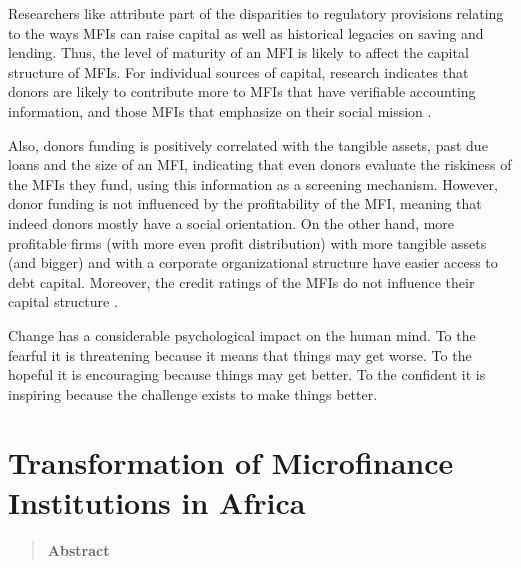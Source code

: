 \documentclass[a4paper,nobind]{templates/ociamthesis}
\begin{document}
Researchers like \textcite{bayai2016financing} attribute part of the disparities to regulatory provisions relating to the ways MFIs can raise capital as well as historical legacies on saving and lending. Thus, the level of maturity of an MFI is likely to affect the capital structure of MFIs. For individual sources of capital, research indicates that donors are likely to contribute more to MFIs that have verifiable accounting information, and those MFIs that emphasize on their social mission \textcite{hudon2010management}.

Also, donors funding is positively correlated with the tangible assets, past due loans and the size of an MFI, indicating that even donors evaluate the riskiness of the MFIs they fund, using this information as a screening mechanism. However, donor funding is not influenced by the profitability of the MFI, meaning that indeed donors mostly have a social orientation. On the other hand, more profitable firms (with more even profit distribution) with more tangible assets (and bigger) and with a corporate organizational structure have easier access to debt capital. Moreover, the credit ratings of the MFIs do not influence their capital structure \autocite{tchuigoua2014institutional}.

\begin{savequote}
Change has a considerable psychological impact on the human mind. To the
fearful it is threatening because it means that things may get worse. To
the hopeful it is encouraging because things may get better. To the
confident it is inspiring because the challenge exists to make things
better.
\end{savequote}



\hypertarget{transformation-of-microfinance-institutions-in-africa}{%
\chapter{Transformation of Microfinance Institutions in Africa}\label{transformation-of-microfinance-institutions-in-africa}}

\minitoc 

\begin{quote}
\textbf{Abstract}
\end{quote}
\end{document}

